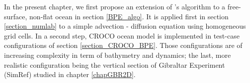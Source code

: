 In the present chapter, we first propose an extension of \cite{winters_available_1995}'s algorithm to a free-surface, non-flat ocean in section \ref{BPE_algo}. It is applied first in section \ref{section_numlab} to a simple advection - diffusion equation using homogeneous grid cells. In a second step, CROCO ocean model is implemented in test-case configurations of section \ref{section_CROCO_BPE}. Those configurations are of increasing complexity in term of bathymetry and dynamics; the last, more realistic configuration being the vertical section of Gibraltar Experiment (SimRef) studied in chapter \ref{chapGBR2D}.


